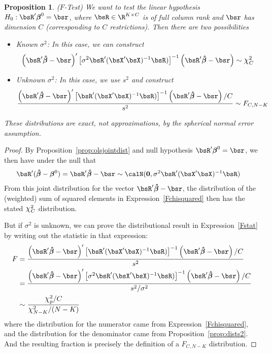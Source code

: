 \documentclass[12pt]{article}
\theoremstyle{plain}
\newtheorem{prop}[thm]{Proposition}
\theoremstyle{definition}
\theoremstyle{remark}
\newcommand*{\Chi}{\mbox{\large$\chi$}} %
\newcommand{\bsbeta}{\boldsymbol{\beta}}
\newcommand{\bshatbeta}{\boldsymbol{\hat{\beta}}}
\renewcommand{\bso}{\boldsymbol{0}}
\begin{document}
\begin{prop}\emph{($F$-Test)}
\label{prop:Ftest}
We want to test the linear hypothesis $H_0: \bsR'\bsbeta^0 = \bsr$,
where $\bsR\in \R^{K\times C}$ is of full column rank and $\bsr$ has
dimension $C$ (corresponding to $C$ restrictions).
Then there are two possibilities
\begin{itemize}
  \item \emph{Known $\sigma^2$}:
    In this case, we can construct
    \begin{align}
      \left(\bsR'\bshatbeta-\bsr\right)'
      \left[\sigma^2 \bsR'(\bsX'\bsX)^{-1}\bsR)\right]^{-1}
      \left(\bsR'\bshatbeta-\bsr\right)
      \sim \Chi_C^2
      \label{Fchisquared}
    \end{align}
  \item
    \emph{Unknown $\sigma^2$}:
    In this case, we use $s^2$ and construct
    \begin{align}
      \frac{%
      \left(\bsR'\bshatbeta-\bsr\right)'
      \left[\bsR'(\bsX'\bsX)^{-1}\bsR)\right]^{-1}
      \left(\bsR'\bshatbeta-\bsr\right)/C
      }{s^2}
      \sim F_{C,N-K}
      \label{Fstat}
    \end{align}
\end{itemize}
These distributions are \emph{exact}, not approximations, by the
spherical normal error assumption.
\end{prop}
\begin{proof}
By Proposition~\ref{prop:olsjointdist}
and null hypothesis $\bsR'\bsbeta^0=\bsr$,
we then have under the null that
\begin{align*}
  \bsR'(\bshatbeta-\bsbeta^0)
  =
  \bsR'\bshatbeta-\bsr
  &\sim \calN(\bso,\sigma^2 \bsR'(\bsX'\bsX)^{-1}\bsR)
\end{align*}
From this joint distribution for the vector $\bsR'\bshatbeta-\bsr$, the
distribution of the (weighted) sum of squared elements in
Expression~\ref{Fchisquared} then has the stated $\Chi^2_C$
distribution.

But if $\sigma^2$ is unknown, we can prove the distributional result in
Expression~\ref{Fstat} by writing out the statistic in that expression:
\begin{align*}
  F &=
  \frac{%
  \left(\bsR'\bshatbeta-\bsr\right)'
  \left[\bsR'(\bsX'\bsX)^{-1}\bsR)\right]^{-1}
  \left(\bsR'\bshatbeta-\bsr\right)/C
  }{s^2}
  \\
  &=
  \frac{%
  \left(\bsR'\bshatbeta-\bsr\right)'
  \left[\sigma^2\bsR'(\bsX'\bsX)^{-1}\bsR)\right]^{-1}
  \left(\bsR'\bshatbeta-\bsr\right)/C
  }{s^2/\sigma^2}
  \\
  &\sim
  \frac{%
    \Chi^2_p/C
  }{\Chi^2_{N-K}/(N-K)}
\end{align*}
where the distribution for the numerator came from
Expression~\ref{Fchisquared}, and the distribution for the denominator
came from Proposition~\ref{prop:dists2}.
And the resulting fraction is precisely the definition of a $F_{C,N-K}$
distribution.
\end{proof}
\end{document}
